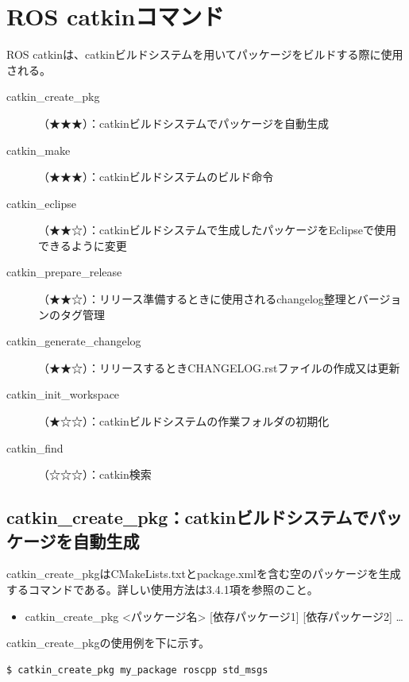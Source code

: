 \section{ROS catkinコマンド}

ROS catkinは、catkinビルドシステムを用いてパッケージをビルドする際に使用される。

\vspace{\baselineskip}
\noindent
\begin{description}
\item[catkin\_create\_pkg]（★★★）：catkinビルドシステムでパッケージを自動生成
\item[catkin\_make]（★★★）：catkinビルドシステムのビルド命令
\item[catkin\_eclipse]（★★☆）：catkinビルドシステムで生成したパッケージをEclipseで使用できるように変更
\item[catkin\_prepare\_release]（★★☆）：リリース準備するときに使用されるchangelog整理とバージョンのタグ管理
\item[catkin\_generate\_changelog]（★★☆）：リリースするときCHANGELOG.rstファイルの作成又は更新
\item[catkin\_init\_workspace]（★☆☆）：catkinビルドシステムの作業フォルダの初期化
\item[catkin\_find]（☆☆☆）：catkin検索
\end{description}

\subsection{catkin\_create\_pkg：catkinビルドシステムでパッケージを自動生成}

catkin\_create\_pkgはCMakeLists.txtとpackage.xmlを含む空のパッケージを生成するコマンドである。詳しい使用方法は3.4.1項を参照のこと。

\begin{itemize}
\item catkin\_create\_pkg <パッケージ名> [依存パッケージ1] [依存パッケージ2] …
\end{itemize}

catkin\_create\_pkgの使用例を下に示す。

\begin{lstlisting}[language=ROS]
$ catkin_create_pkg my_package roscpp std_msgs
\end{lstlisting}


